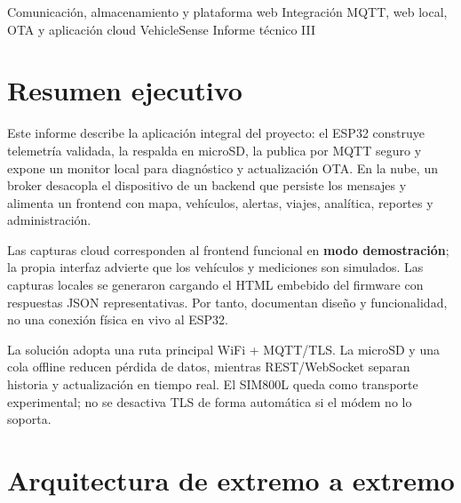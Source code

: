 \documentclass[11pt,a4paper,oneside]{report}
\begin{document}
\VScover
  {Comunicación, almacenamiento y plataforma web}
  {Integración MQTT, web local, OTA y aplicación cloud VehicleSense}
  {Informe técnico III}

\chapter*{Resumen ejecutivo}
Este informe describe la aplicación integral del proyecto: el ESP32 construye
telemetría validada, la respalda en microSD, la publica por MQTT seguro y expone un
monitor local para diagnóstico y actualización OTA. En la nube, un broker desacopla
el dispositivo de un backend que persiste los mensajes y alimenta un frontend con
mapa, vehículos, alertas, viajes, analítica, reportes y administración.

Las capturas cloud corresponden al frontend funcional en \textbf{modo demostración};
la propia interfaz advierte que los vehículos y mediciones son simulados. Las capturas
locales se generaron cargando el HTML embebido del firmware con respuestas JSON
representativas. Por tanto, documentan diseño y funcionalidad, no una conexión física
en vivo al ESP32.

\begin{vsidea}[title={Resultado de integración}]
La solución adopta una ruta principal WiFi + MQTT/TLS. La microSD y una cola offline
reducen pérdida de datos, mientras REST/WebSocket separan historia y actualización en
tiempo real. El SIM800L queda como transporte experimental; no se desactiva TLS de
forma automática si el módem no lo soporta.
\end{vsidea}

\tableofcontents
\listoffigures
\clearpage
{}

\chapter{Arquitectura de extremo a extremo}
\end{document}
